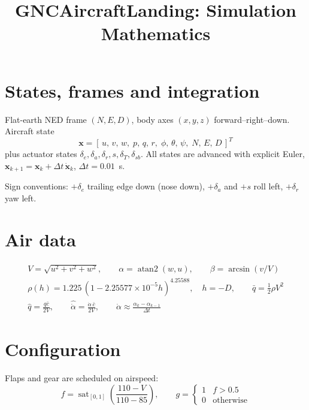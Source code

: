\documentclass[10pt]{article}
\title{GNCAircraftLanding: Simulation Mathematics}
\author{}
\date{}
\newcommand{\sat}{\operatorname{sat}}
\begin{document}
\maketitle
\vspace{-3em}

\section{States, frames and integration}
Flat-earth NED frame $(N,E,D)$, body axes $(x,y,z)$ forward--right--down. Aircraft state
\[
\mathbf{x} = [\,u,\,v,\,w,\;p,\,q,\,r,\;\phi,\,\theta,\,\psi,\;N,\,E,\,D\,]^T
\]
plus actuator states $\delta_e,\delta_a,\delta_r,s,\delta_T,\delta_{sb}$. All states are advanced with explicit Euler,
$\mathbf{x}_{k+1}=\mathbf{x}_k+\Delta t\,\dot{\mathbf{x}}_k$, $\Delta t = 0.01$~s.

Sign conventions: $+\delta_e$ trailing edge down (nose down), $+\delta_a$ and $+s$ roll left, $+\delta_r$ yaw left.

\section{Air data}
\begin{gather*}
V=\sqrt{u^2+v^2+w^2},\qquad \alpha=\operatorname{atan2}(w,u),\qquad \beta=\arcsin(v/V)\\
\rho(h)=1.225\,(1-2.25577\times10^{-5}h)^{4.25588},\quad h=-D,\qquad \bar q=\tfrac12\rho V^2\\
\hat q=\frac{q\bar c}{2V},\qquad \hat{\dot\alpha}=\frac{\dot\alpha\,\bar c}{2V},\qquad \dot\alpha\approx\frac{\alpha_k-\alpha_{k-1}}{\Delta t}
\end{gather*}

\section{Configuration}
Flaps and gear are scheduled on airspeed:
\[
f=\sat_{[0,1]}\!\left(\frac{110-V}{110-85}\right),\qquad g=\begin{cases}1 & f>0.5\\0&\text{otherwise}\end{cases}
\]
\end{document}
